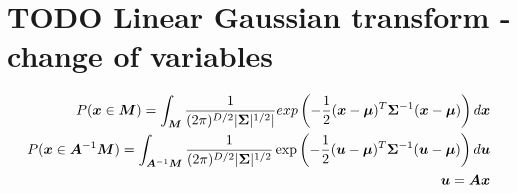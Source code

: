 \section{TODO Linear Gaussian transform - change of variables}

\begin{align}
P({\bm{x}} \in {\bm{M}}) = \int_{\bm{M}} \frac{1}{(2 \pi)^{D/2} |{\bm{\Sigma}}|^{1/2}|} exp \left(-\frac{1}{2} ({\bm{x}} - {\bm{\mu}})^T {\bm{\Sigma}}^{-1} ({\bm{x}} - {\bm{\mu}}) \right) d {\bm{x}} \\
P({\bm{x}} \in {\bm{A}}^{-1} {\bm{M}}) = \int_{{\bm{A}}^{-1} {\bm{M}}} \frac{1}{(2 \pi)^{D/2} |{\bm{\Sigma}}|^{1/2}} \exp \left(-\frac{1}{2} ({\bm{u}} - {\bm{\mu}})^T {\bm{\Sigma}}^{-1} ({\bm{u}} - {\bm{\mu}}) \right) d {\bm{u}} \\
{\bm{u}} = {\bm{A}} {\bm{x}}
\end{align}

